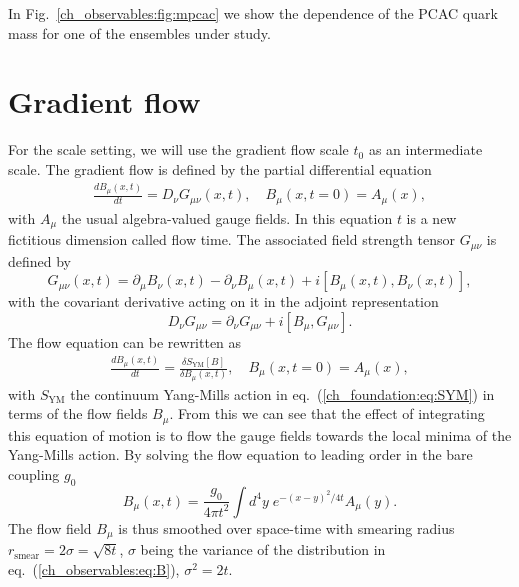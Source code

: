 In Fig.~\ref{ch_observables:fig:mpcac} we show the dependence of the PCAC quark mass for one of the ensembles under study.


\section{Gradient flow}
\label{ch_observables:sec:Flow}

For the scale setting, we will use the gradient flow scale $t_0$ as an intermediate scale. The gradient flow is defined by the partial differential equation~\citep{Luscher:2010we,1006.4518}
\begin{gather}
\label{ch_observables:eq:flow}
\frac{dB_{\mu}(x,t)}{dt}=D_{\nu}G_{\mu\nu}(x,t), \quad B_{\mu}(x,t=0)=A_{\mu}(x),
\end{gather}
with $A_{\mu}$ the usual algebra-valued gauge fields. In this equation $t$ is a new fictitious dimension called flow time. The associated field strength tensor $G_{\mu\nu}$ is defined by
\begin{equation}
G_{\mu\nu}(x,t)=\partial_{\mu}B_{\nu}(x,t)-\partial_{\nu}B_{\mu}(x,t)+i\left[B_{\mu}(x,t),B_{\nu}(x,t)\right],
\end{equation}
with the covariant derivative acting on it in the adjoint representation
\begin{equation}
D_{\nu}G_{\mu\nu}=\partial_{\nu}G_{\mu\nu}+i\left[B_{\mu},G_{\mu\nu}\right].
\end{equation}
The flow equation can be rewritten as
\begin{gather}
\frac{dB_{\mu}(x,t)}{dt}=\frac{\delta S_{\textrm{YM}}[B]}{\delta B_{\mu}(x,t)}, \quad B_{\mu}(x,t=0)=A_{\mu}(x),
\end{gather}
with $S_{\textrm{YM}}$ the continuum Yang-Mills action in eq.~(\ref{ch_foundation:eq:SYM}) in terms of the flow fields $B_{\mu}$. From this we can see that the effect of integrating this equation of motion is to flow the gauge fields towards the local minima of the Yang-Mills action. By solving the flow equation to leading order in the bare coupling $g_0$
\begin{equation}
\label{ch_observables:eq:B}
B_{\mu}(x,t)=\frac{g_0}{4\pi t^2}\int d^4y\;e^{-(x-y)^2/4t}A_{\mu}(y).
\end{equation}
The flow field $B_{\mu}$ is thus smoothed over space-time with smearing radius $r_{\textrm{smear}}=2\sigma=\sqrt{8t}$, $\sigma$ being the variance of the distribution in eq.~(\ref{ch_observables:eq:B}), $\sigma^2=2t$.

